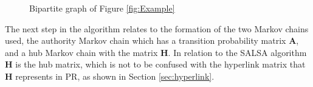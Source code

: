 \documentclass[11pt]{report}
\begin{document}
\begin{figure}[h!]
\centering
{}\caption{Bipartite graph of Figure \ref{fig:Example} } \label{fig:bipartite}
\end{figure}

The next step in the algorithm relates to the formation of the two Markov chains used, the authority Markov chain which has a transition probability matrix \textbf{A}, and a hub Markov chain with the matrix \textbf{H}. In relation to the SALSA algorithm \textbf{H} is the hub matrix, which is not to be confused with the hyperlink matrix that \textbf{H} represents in PR, as shown in Section \ref{sec:hyperlink}.  
\end{document}
